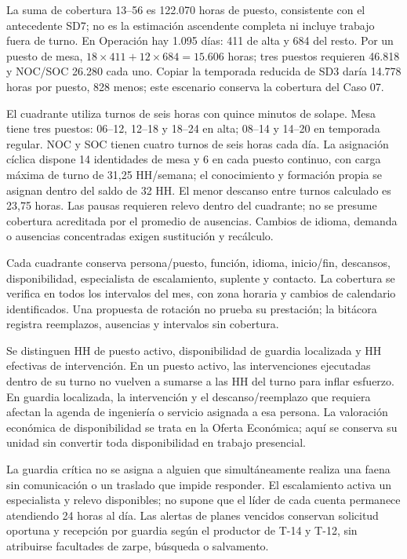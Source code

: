 La suma de cobertura 13--56 es 122.070 horas de puesto, consistente con el antecedente SD7; no es la estimación ascendente completa ni incluye trabajo fuera de turno. En Operación hay 1.095 días: 411 de alta y 684 del resto. Por un puesto de mesa, $18\times411+12\times684=15.606$ horas; tres puestos requieren 46.818 y NOC/SOC 26.280 cada uno. Copiar la temporada reducida de SD3 daría 14.778 horas por puesto, 828 menos; este escenario conserva la cobertura del Caso 07.

El cuadrante utiliza turnos de seis horas con quince minutos de solape. Mesa tiene tres puestos: 06--12, 12--18 y 18--24 en alta; 08--14 y 14--20 en temporada regular. NOC y SOC tienen cuatro turnos de seis horas cada día. La asignación cíclica dispone 14 identidades de mesa y 6 en cada puesto continuo, con carga máxima de turno de 31,25 HH/semana; el conocimiento y formación propia se asignan dentro del saldo de 32 HH. El menor descanso entre turnos calculado es 23,75 horas. Las pausas requieren relevo dentro del cuadrante; no se presume cobertura acreditada por el promedio de ausencias. Cambios de idioma, demanda o ausencias concentradas exigen sustitución y recálculo.

Cada cuadrante conserva persona/puesto, función, idioma, inicio/fin, descansos, disponibilidad, especialista de escalamiento, suplente y contacto. La cobertura se verifica en todos los intervalos del mes, con zona horaria y cambios de calendario identificados. Una propuesta de rotación no prueba su prestación; la bitácora registra reemplazos, ausencias y intervalos sin cobertura.

Se distinguen HH de puesto activo, disponibilidad de guardia localizada y HH efectivas de intervención. En un puesto activo, las intervenciones ejecutadas dentro de su turno no vuelven a sumarse a las HH del turno para inflar esfuerzo. En guardia localizada, la intervención y el descanso/reemplazo que requiera afectan la agenda de ingeniería o servicio asignada a esa persona. La valoración económica de disponibilidad se trata en la Oferta Económica; aquí se conserva su unidad sin convertir toda disponibilidad en trabajo presencial.

La guardia crítica no se asigna a alguien que simultáneamente realiza una faena sin comunicación o un traslado que impide responder. El escalamiento activa un especialista y relevo disponibles; no supone que el líder de cada cuenta permanece atendiendo 24 horas al día. Las alertas de planes vencidos conservan solicitud oportuna y recepción por guardia según el productor de T-14 y T-12, sin atribuirse facultades de zarpe, búsqueda o salvamento.

